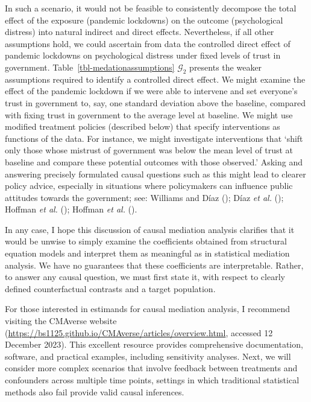\documentclass[
  single column]{article}
\begin{document}
In such a scenario, it would not be feasible to consistently decompose
the total effect of the exposure (pandemic lockdowns) on the outcome
(psychological distress) into natural indirect and direct effects.
Nevertheless, if all other assumptions hold, we could ascertain from
data the controlled direct effect of pandemic lockdowns on psychological
distress under fixed levels of trust in government.
Table~\ref{tbl-medationassumptions} \(\mathcal{G}_2\) presents the
weaker assumptions required to identify a controlled direct effect. We
might examine the effect of the pandemic lockdown if we were able to
intervene and set everyone's trust in government to, say, one standard
deviation above the baseline, compared with fixing trust in government
to the average level at baseline. We might use modified treatment
policies (described below) that specify interventions as functions of
the data. For instance, we might investigate interventions that `shift
only those whose mistrust of government was below the mean level of
trust at baseline and compare these potential outcomes with those
observed.' Asking and answering precisely formulated causal questions
such as this might lead to clearer policy advice, especially in
situations where policymakers can influence public attitudes towards the
government; see: Williams and Díaz ();
Díaz \emph{et al.} (); Hoffman \emph{et
al.} (); Hoffman \emph{et al.}
().

In any case, I hope this discussion of causal mediation analysis
clarifies that it would be unwise to simply examine the coefficients
obtained from structural equation models and interpret them as
meaningful as in statistical mediation analysis. We have no guarantees
that these coefficients are interpretable. Rather, to answer any causal
question, we must first state it, with respect to clearly defined
counterfactual contrasts and a target population.

For those interested in estimands for causal mediation analysis, I
recommend visiting the CMAverse website
(\url{https://bs1125.github.io/CMAverse/articles/overview.html},
accessed 12 December 2023). This excellent resource provides
comprehensive documentation, software, and practical examples, including
sensitivity analyses. Next, we will consider more complex scenarios that
involve feedback between treatments and confounders across multiple time
points, settings in which traditional statistical methods also fail
provide valid causal inferences.
\end{document}

